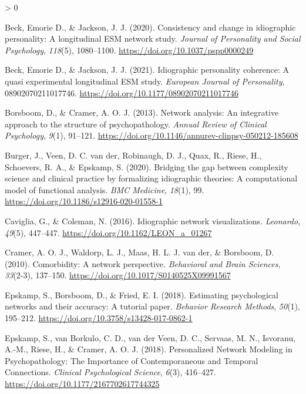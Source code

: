\documentclass[
  english,
  man]{apa6}
\newlength{\cslhangindent}
\newenvironment{CSLReferences}[2] %
 {%
  \setlength{\parindent}{0pt}
  \ifodd #1 \everypar{\setlength{\hangindent}{\cslhangindent}}\ignorespaces\fi
  \ifnum #2 > 0
  \setlength{\parskip}{#2\baselineskip}
  \fi
 }%
 {}
\begin{document}
\hypertarget{refs}{}
\begin{CSLReferences}{1}{0}
\leavevmode\hypertarget{ref-BeckJackson2020a}{}%
Beck, Emorie D., \& Jackson, J. J. (2020). Consistency and change in idiographic personality: A longitudinal ESM network study. \emph{Journal of Personality and Social Psychology}, \emph{118}(5), 1080--1100. \url{https://doi.org/10.1037/pspp0000249}

\leavevmode\hypertarget{ref-BeckJackson2021}{}%
Beck, Emorie D., \& Jackson, J. J. (2021). Idiographic personality coherence: A quasi experimental longitudinal ESM study. \emph{European Journal of Personality}, 08902070211017746. \url{https://doi.org/10.1177/08902070211017746}

\leavevmode\hypertarget{ref-BorsboomCramer2013}{}%
Borsboom, D., \& Cramer, A. O. J. (2013). Network analysis: An integrative approach to the structure of psychopathology. \emph{Annual Review of Clinical Psychology}, \emph{9}(1), 91--121. \url{https://doi.org/10.1146/annurev-clinpsy-050212-185608}

\leavevmode\hypertarget{ref-BurgerEtAl2020}{}%
Burger, J., Veen, D. C. van der, Robinaugh, D. J., Quax, R., Riese, H., Schoevers, R. A., \& Epskamp, S. (2020). Bridging the gap between complexity science and clinical practice by formalizing idiographic theories: A computational model of functional analysis. \emph{BMC Medicine}, \emph{18}(1), 99. \url{https://doi.org/10.1186/s12916-020-01558-1}

\leavevmode\hypertarget{ref-CavigliaColeman2016}{}%
Caviglia, G., \& Coleman, N. (2016). Idiographic network visualizations. \emph{Leonardo}, \emph{49}(5), 447--447. \url{https://doi.org/10.1162/LEON_a_01267}

\leavevmode\hypertarget{ref-CramerEtAl2010}{}%
Cramer, A. O. J., Waldorp, L. J., Maas, H. L. J. van der, \& Borsboom, D. (2010). Comorbidity: A network perspective. \emph{Behavioral and Brain Sciences}, \emph{33}(2-3), 137--150. \url{https://doi.org/10.1017/S0140525X09991567}

\leavevmode\hypertarget{ref-EpskampEtAl2018}{}%
Epskamp, S., Borsboom, D., \& Fried, E. I. (2018). Estimating psychological networks and their accuracy: A tutorial paper. \emph{Behavior Research Methods}, \emph{50}(1), 195--212. \url{https://doi.org/10.3758/s13428-017-0862-1}

\leavevmode\hypertarget{ref-EpskampEtAl2018a}{}%
Epskamp, S., van Borkulo, C. D., van der Veen, D. C., Servaas, M. N., Isvoranu, A.-M., Riese, H., \& Cramer, A. O. J. (2018). Personalized Network Modeling in Psychopathology: The Importance of Contemporaneous and Temporal Connections. \emph{Clinical Psychological Science}, \emph{6}(3), 416--427. \url{https://doi.org/10.1177/2167702617744325}


\end{CSLReferences}
\end{document}
